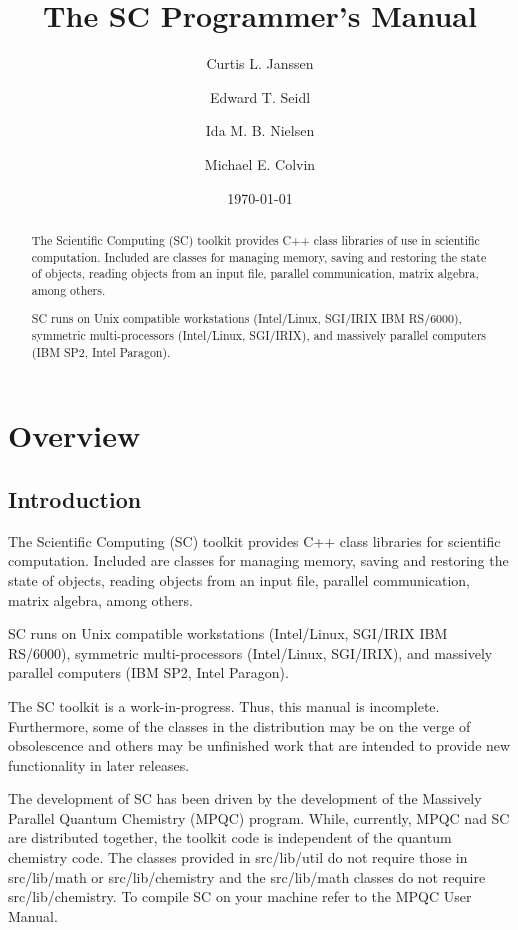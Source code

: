 \documentclass{report}
\begin{document}
\title{The SC Programmer's Manual}

\author{Curtis L. Janssen \and Edward T. Seidl \and Ida M. B. Nielsen
        \and Michael E. Colvin}

\date{\today}

\maketitle

\begin{abstract}

The Scientific Computing (SC) toolkit provides C++ class libraries of use
in scientific computation.  Included are classes for managing memory,
saving and restoring the state of objects, reading objects from an input
file, parallel communication, matrix algebra, among others.

SC runs on Unix compatible workstations (Intel/Linux, SGI/IRIX
IBM RS/6000), symmetric multi-processors (Intel/Linux, SGI/IRIX),
and massively parallel computers (IBM SP2, Intel Paragon).

\end{abstract}

\tableofcontents

\part{Overview}

\chapter{Introduction}

The Scientific Computing (SC) toolkit provides C++ class libraries for
scientific computation.  Included are classes for managing memory, saving
and restoring the state of objects, reading objects from an input file,
parallel communication, matrix algebra, among others.

SC runs on Unix compatible workstations (Intel/Linux, SGI/IRIX
IBM RS/6000), symmetric multi-processors (Intel/Linux, SGI/IRIX),
and massively parallel computers (IBM SP2, Intel Paragon).

The SC toolkit is a work-in-progress.  Thus, this manual is incomplete.
Furthermore, some of the classes in the distribution may be on the verge of
obsolescence and others may be unfinished work that are intended to provide
new functionality in later releases.

The development of SC has been driven by the development of the Massively
Parallel Quantum Chemistry (MPQC) program.  While, currently, MPQC nad SC
are distributed together, the toolkit code is independent of the quantum
chemistry code.  The classes provided in src/lib/util do not require those
in src/lib/math or src/lib/chemistry and the src/lib/math classes do not
require src/lib/chemistry.  To compile SC on your machine refer to the
MPQC User Manual.
\end{document}
